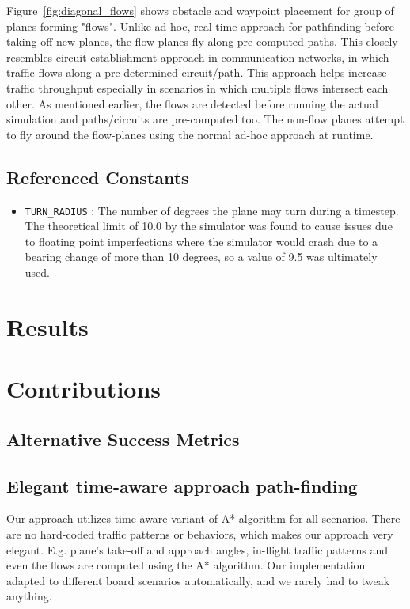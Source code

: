 \documentclass[10pt]{article}
\newcommand{\ms}[1] {
  \texttt{#1}
}
\begin{document}
Figure~\ref{fig:diagonal_flows} shows obstacle and waypoint placement
for group of planes forming "flows". Unlike ad-hoc, real-time approach for
pathfinding before taking-off new planes, the flow planes fly along pre-computed
paths. This closely resembles circuit establishment approach in communication
networks, in which traffic flows along a pre-determined circuit/path. This
approach helps increase traffic throughput especially in scenarios in which
multiple flows intersect each other. As mentioned earlier, the flows are
detected before running the actual simulation and paths/circuits are
pre-computed too. The non-flow planes attempt to fly around the flow-planes
using the normal ad-hoc approach at runtime.



\subsection{Referenced Constants}
\begin{itemize}
  \item \ms{TURN\_RADIUS}: The number of degrees the plane may turn during a timestep. The theoretical limit of 
    10.0 by the simulator was found to cause issues due to floating point imperfections where the simulator would
    crash due to a bearing change of more than 10 degrees, so a value of 9.5 was ultimately used.
\end{itemize}


\newpage
\section{Results}

\newpage
\section{Contributions}

\subsection{Alternative Success Metrics}

\subsection{Elegant time-aware approach path-finding}

Our approach utilizes time-aware variant of A* algorithm for all scenarios.
There are no hard-coded traffic patterns or behaviors, which makes our approach
very elegant. E.g. plane's take-off and approach angles, in-flight traffic
patterns and even the flows are computed using the A* algorithm. Our
implementation adapted to different board scenarios automatically, and we rarely
had to tweak anything.
\end{document}
